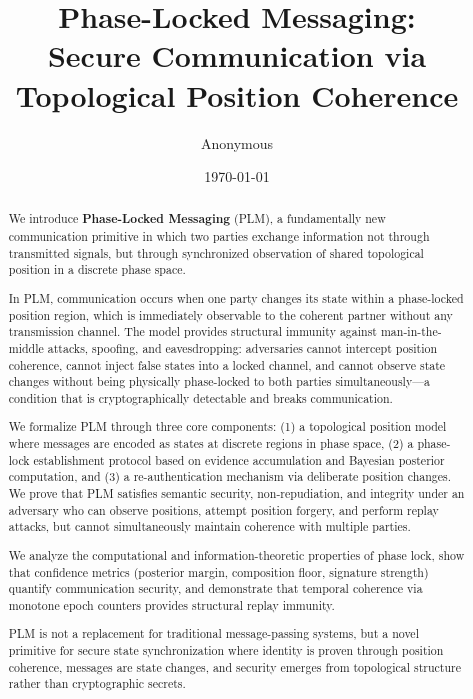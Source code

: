 \documentclass[11pt,a4paper]{article}
\title{\textbf{Phase-Locked Messaging: \\ Secure Communication via Topological Position Coherence}}
\author{Anonymous}
\date{\today}
\theoremstyle{definition}
\begin{document}
\maketitle

\begin{abstract}
We introduce \textbf{Phase-Locked Messaging} (PLM), a fundamentally new communication primitive in which two parties exchange information not through transmitted signals, but through synchronized observation of shared topological position in a discrete phase space.

In PLM, communication occurs when one party changes its state within a phase-locked position region, which is immediately observable to the coherent partner without any transmission channel. The model provides structural immunity against man-in-the-middle attacks, spoofing, and eavesdropping: adversaries cannot intercept position coherence, cannot inject false states into a locked channel, and cannot observe state changes without being physically phase-locked to both parties simultaneously—a condition that is cryptographically detectable and breaks communication.

We formalize PLM through three core components: (1) a topological position model where messages are encoded as states at discrete regions in phase space, (2) a phase-lock establishment protocol based on evidence accumulation and Bayesian posterior computation, and (3) a re-authentication mechanism via deliberate position changes. We prove that PLM satisfies semantic security, non-repudiation, and integrity under an adversary who can observe positions, attempt position forgery, and perform replay attacks, but cannot simultaneously maintain coherence with multiple parties.

We analyze the computational and information-theoretic properties of phase lock, show that confidence metrics (posterior margin, composition floor, signature strength) quantify communication security, and demonstrate that temporal coherence via monotone epoch counters provides structural replay immunity.

PLM is not a replacement for traditional message-passing systems, but a novel primitive for secure state synchronization where identity is proven through position coherence, messages are state changes, and security emerges from topological structure rather than cryptographic secrets.

\end{abstract}
\end{document}
